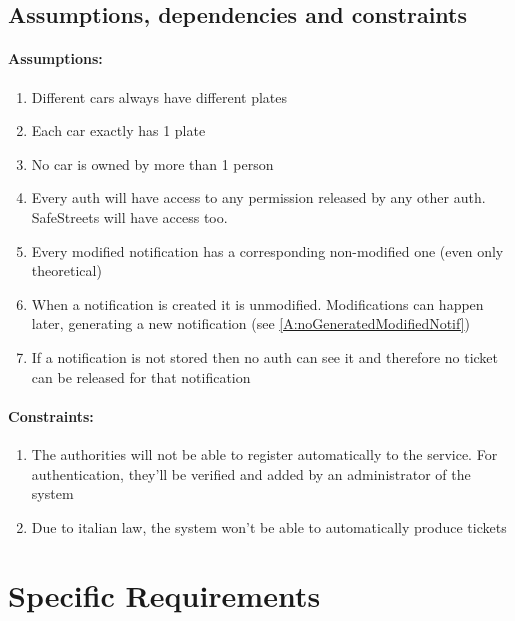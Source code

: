 \documentclass{article}
\newcommand{\enum}[1]{\texttt{#1.\arabic*}}
\begin{document}
	
	\subsection{Assumptions, dependencies and constraints}
	
	\paragraph{Assumptions:}
		\begin{enumerate}[label=\enum{A}]
			\item \label{A:disjPlates} Different cars always have different plates
			\item \label{A:Single plate}Each car exactly has 1 plate
			\item \label{A:singleOwner}No car is owned by more than 1 person
			\item \label{A:accessiblePermissions}Every auth will have access to any permission released by any other auth. SafeStreets will have access too.
			\item \label{A:noGeneratedModifiedNotif}Every modified notification has a corresponding non-modified one (even only theoretical)
			\item \label{A:newNotificationsAreNotModified}When a notification is created it is unmodified. Modifications can happen later, generating a new notification (see \ref{A:noGeneratedModifiedNotif})
			\item \label{A:authsNotClairvoyants}If a notification is not stored then no auth can see it and therefore no ticket can be released for that notification
		\end{enumerate}
	
	\paragraph{Constraints:}
		\begin{enumerate}[label=\enum{C}]
			\item The authorities will not be able to register automatically to the service. For authentication, they'll be verified and added by an administrator of the system
			\item \label{C:noAutoTickets}Due to italian law, the system won't be able to automatically produce tickets
		\end{enumerate}
	
\newpage
\section{Specific Requirements} 
\end{document}
